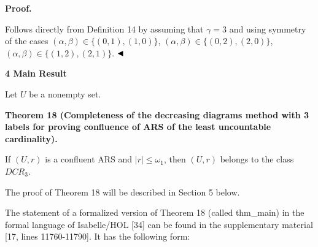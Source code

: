   
 
 
 
 
\par\medskip\noindent\textbf{Proof.}\par
 
 
Follows directly from Definition 14 by assuming that $\gamma=3$ and using symmetry of the cases $(\alpha,\beta)\in\{(0,1),(1,0)\}$, $(\alpha,\beta)\in\{(0,2),(2,0)\}$, $(\alpha,\beta)\in\{(1,2),(2,1)\}$. $\hfill\blacktriangleleft$\par
 
 
 
 


 
\par\medskip\noindent\textbf{4 Main Result}\par
 
 
Let $U$ be a nonempty set.\par
 
 
 
\par\medskip\noindent\textbf{Theorem 18 (Completeness of the decreasing diagrams method with 3 labels for proving confluence of ARS of the least uncountable cardinality).}\par
 
 
If $(U,r)$ is a confluent ARS and $|r|\leq\omega_{1}$, then $(U,r)$ belongs to the class $DCR_{3}$.\par
 
 
 
 
The proof of Theorem 18 will be described in Section 5 below.\par
 
 
 
The statement of a formalized version of Theorem 18 (called thm\_main) in the formal language of Isabelle/HOL [34] can be found in the supplementary material [17, lines 11760-11790]. It has the following form:\par
 
